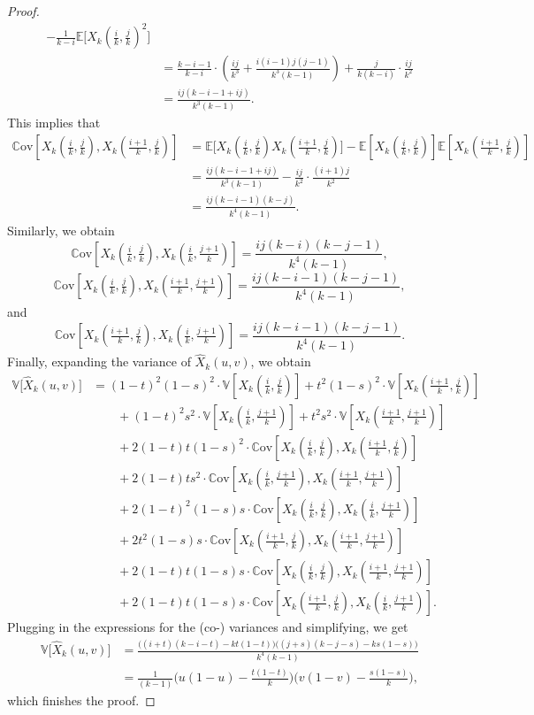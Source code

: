 \documentclass[10pt,a4paper]{amsart}
\newcommand{\Cov}{\mathbb{C}\mathrm{ov}}
\newcommand{\EE}{\mathbb{E}}
\newcommand{\VV}{\mathbb{V}}
\newcommand{\Xhat}{\widehat{X}}
\begin{document}
\begin{proof}
\begin{align*}
    - \frac{1}{k-i}\EE\big[X_k(\tfrac{i}{k},\tfrac{j}{k})^2\big] \\
    &=  \frac{k-i-1}{k-i} \cdot \left(\frac{ij}{k^3} + \frac{i(i-1)j(j-1)}{k^3 (k-1)}\right) + \frac{j}{k(k-i)}\cdot \frac{ij}{k^2} \\
    &=  \frac{ij(k-i-1+ij)}{k^3(k-1)}.
\end{align*}
This implies that
\begin{align*}
    \Cov[X_k(\tfrac{i}{k},\tfrac{j}{k}), X_k(\tfrac{i+1}{k},\tfrac{j}{k})] &= \EE\big[X_k(\tfrac{i}{k},\tfrac{j}{k})X_k(\tfrac{i+1}{k},\tfrac{j}{k})\big] - \EE[X_k(\tfrac{i}{k},\tfrac{j}{k})]\EE[X_k(\tfrac{i+1}{k},\tfrac{j}{k})] \\
    &=  \frac{ij(k-i-1+ij)}{k^3(k-1)} - \frac{ij}{k^2}\cdot\frac{(i+1)j}{k^2} \\
    &=  \frac{ij(k-i-1)(k-j)}{k^4(k-1)}. 
\end{align*}
Similarly, we obtain
$$\Cov[X_k(\tfrac{i}{k},\tfrac{j}{k}), X_k(\tfrac{i}{k},\tfrac{j+1}{k})] = \frac{ij(k-i)(k-j-1)}{k^4(k-1)}, $$
$$\Cov[X_k(\tfrac{i}{k},\tfrac{j}{k}), X_k(\tfrac{i+1}{k},\tfrac{j+1}{k})] = \frac{ij(k-i-1)(k-j-1)}{k^4(k-1)}, $$
and
$$\Cov[X_k(\tfrac{i+1}{k},\tfrac{j}{k}), X_k(\tfrac{i}{k},\tfrac{j+1}{k})] = \frac{ij(k-i-1)(k-j-1)}{k^4(k-1)}. $$
Finally, expanding the variance of $\Xhat_k(u,v)$, we obtain
\begin{align*}
    \VV\big[\Xhat_k(u,v)\big] &= (1-t)^2(1-s)^2\cdot\VV[X_k(\tfrac{i}{k},\tfrac{j}{k})] + t^2(1-s)^2\cdot\VV[X_k(\tfrac{i+1}{k},\tfrac{j}{k})] \\
    & \qquad + (1-t)^2s^2\cdot\VV[X_k(\tfrac{i}{k},\tfrac{j+1}{k})]+t^2s^2 \cdot\VV[X_k(\tfrac{i+1}{k},\tfrac{j+1}{k})] \\
    & \qquad + 2(1-t)t(1-s)^2\cdot\Cov[X_k(\tfrac{i}{k},\tfrac{j}{k}), X_k(\tfrac{i+1}{k},\tfrac{j}{k})]  \\
    & \qquad + 2(1-t)ts^2\cdot\Cov[X_k(\tfrac{i}{k},\tfrac{j+1}{k}), X_k(\tfrac{i+1}{k},\tfrac{j+1}{k})] \\
    & \qquad + 2(1-t)^2(1-s)s\cdot\Cov[X_k(\tfrac{i}{k},\tfrac{j}{k}), X_k(\tfrac{i}{k},\tfrac{j+1}{k})]  \\
    & \qquad + 2t^2(1-s)s\cdot\Cov[X_k(\tfrac{i+1}{k},\tfrac{j}{k}), X_k(\tfrac{i+1}{k},\tfrac{j+1}{k})] \\
    & \qquad + 2(1-t)t(1-s)s\cdot\Cov[X_k(\tfrac{i}{k},\tfrac{j}{k}), X_k(\tfrac{i+1}{k},\tfrac{j+1}{k})]  \\
    & \qquad + 2(1-t)t(1-s)s\cdot\Cov[X_k(\tfrac{i+1}{k},\tfrac{j}{k}), X_k(\tfrac{i}{k},\tfrac{j+1}{k})].
\end{align*}
Plugging in the expressions for the (co-) variances and simplifying, we get
\begin{align*}
    \VV\big[\Xhat_k(u,v)\big]
    &=\frac{\big((i+t)(k-i-t)-kt(1-t)\big)\big((j+s)(k-j-s)-ks(1-s)\big)}{k^4(k-1)} \\
    &= \frac{1}{(k-1)}\Big(u(1-u)-\frac{t(1-t)}{k}\Big)\Big(v(1-v)-\frac{s(1-s)}{k}\Big),
\end{align*}
which finishes the proof.
\end{proof}
\end{document}
